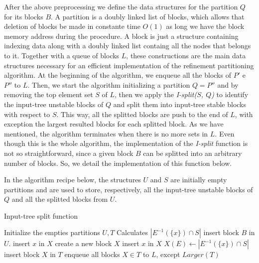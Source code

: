 \documentclass[12pt]{diazessay} %
\begin{document}
After the above preprocessing we define the data structures for the partition $Q$ for its blocks $B$. A partition is a doubly linked list of blocks, which allows that deletion of blocks be made in constante time $O(1)$ as long we have the block memory address during the procedure. A block is just a structure containing indexing data along with a doubly linked list containg all the nodes that belongs to it. Together with a queue of blocks $L$, these constructions are the main data structures necessary for an efficient implementation of the refinement partitioning algorithm. At the beginning of the algorithm, we enqueue all the blocks of $P'$ e $P''$ to $L$. Then, we start the algorithm initializing a partition $Q = P''$ and by removing the top element set $S$ of $L$, then we apply the \textit{I-split($S$, $Q$)} to identify the input-tree unstable blocks of $Q$ and split them into input-tree stable blocks with respect to  $S$. This way, all the splitted blocks are push to the end of $L$, with exception the largest resulted blocks for each splitted block. As we have mentioned, the algorithm terminates when there is no more sets in $L$. Even though this is the whole algorithm, the implementation of the \textit{I-split} function is not so straightforward, since a given block $B$ can be splitted into an arbitrary number of blocks. So, we detail the implementation of this function below.

In the algorithm recipe below, the structures $U$ and $S$ are initially empty partitions and are used to store, respectively, all the input-tree unstable blocks of $Q$ and all the splitted blocks from $U$.

\begin{algorithm}
   \caption{Input-tree split function}
    \begin{algorithmic}[1]
        \State Initialize the empties partitions $U, T$
            	\State Calculates $| E^{-1}(\{x\})\cap S |$
			\EndFor 
			 
				\State insert block $B$ in $U$.
			\EndIf       
		\EndFor
					\State insert $x$ in $X$
				\Else				
					\State create a new block $X$
					\State insert $x$ in $X$
					\State $X(E) \leftarrow | E^{-1}(\{x\})\cap S |$
					\State insert block $X$ in $T$ 
				\EndIf
			\EndFor
			\State enqueue all blocks $X \in T$ to $L$, except $Larger(T)$
        \EndFor
       \EndFunction

\end{algorithmic}
\end{algorithm}
\end{document}
